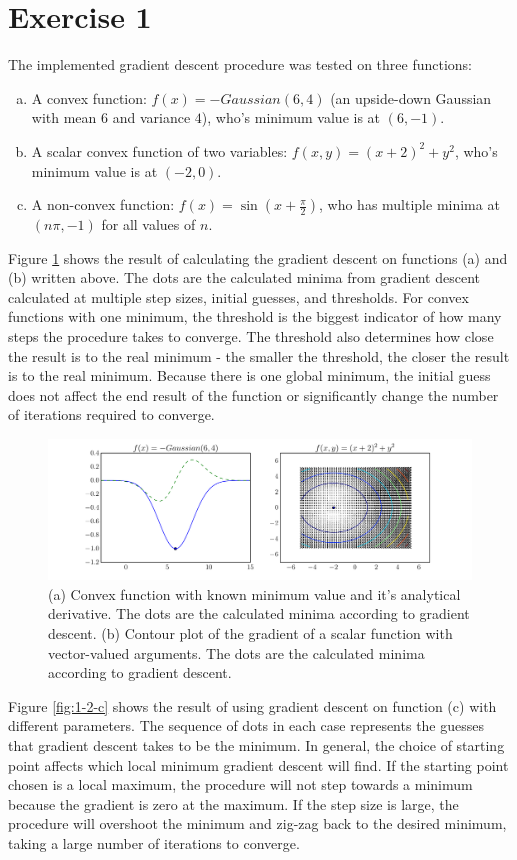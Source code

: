 \documentclass[10pt]{article}
\begin{document}
\section{Exercise 1}

The implemented gradient descent procedure was tested on three functions: 
\begin{enumerate}[(a)]
	\itemsep-0.2em
	\item A convex function: $f(x) = -Gaussian(6, 4)$ (an upside-down Gaussian with mean $6$ and variance $4$), who's minimum value is at $(6, -1)$. 
	\item A scalar convex function of two variables: $f(x, y) = (x + 2)^2 + y^2$, who's minimum value is at $(-2, 0)$.
	\item A non-convex function: $f(x) = \sin(x + \frac{\pi}{2})$, who has multiple minima at $(n \pi, -1)$ for all values of $n$.
\end{enumerate}

Figure \ref{fig:1-2-ab} shows the result of calculating the gradient descent on functions (a) and (b) written above. The dots are the calculated minima from gradient descent calculated at multiple step sizes, initial guesses, and thresholds. For convex functions with one minimum, the threshold is the biggest indicator of how many steps the procedure takes to converge. The threshold also determines how close the result is to the real minimum - the smaller the threshold, the closer the result is to the real minimum. Because there is one global minimum, the initial guess does not affect the end result of the function or significantly change the number of iterations required to converge.

\begin{figure}[!ht]
	\centering
	\includegraphics[width=.66\textwidth]{exercise1-2-ab.pdf}
	\caption{(a) Convex function with known minimum value and it's analytical derivative. The dots are the calculated minima according to gradient descent. (b) Contour plot of the gradient of a scalar function with vector-valued arguments. The dots are the calculated minima according to gradient descent.}
	\label{fig:1-2-ab}
\end{figure}

Figure \ref{fig:1-2-c} shows the result of using gradient descent on function (c) with different parameters. The sequence of dots in each case represents the guesses that gradient descent takes to be the minimum. In general, the choice of starting point affects which local minimum gradient descent will find. If the starting point chosen is a local maximum, the procedure will not step towards a minimum because the gradient is zero at the maximum. If the step size is large, the procedure will overshoot the minimum and zig-zag back to the desired minimum, taking a large number of iterations to converge. 
\end{document}
